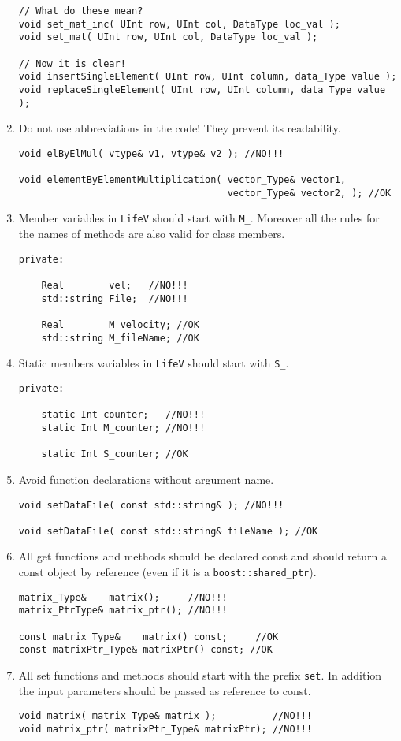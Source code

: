 \documentclass[a4paper]{article}
\begin{document}
\begin{enumerate}
\begin{lstlisting}
// What do these mean?
void set_mat_inc( UInt row, UInt col, DataType loc_val );
void set_mat( UInt row, UInt col, DataType loc_val );

// Now it is clear!
void insertSingleElement( UInt row, UInt column, data_Type value );
void replaceSingleElement( UInt row, UInt column, data_Type value );

  \end{lstlisting}
  \item Do not use abbreviations in the code! They prevent its readability.
\begin{lstlisting}
void elByElMul( vtype& v1, vtype& v2 ); //NO!!!

void elementByElementMultiplication( vector_Type& vector1,
                                     vector_Type& vector2, ); //OK
\end{lstlisting}
  \item Member variables in \texttt{LifeV} should start with \texttt{M\_}. Moreover all the rules for the names of methods are also valid for class members.
\begin{lstlisting}
private:

    Real        vel;   //NO!!!
    std::string File;  //NO!!!

    Real        M_velocity; //OK
    std::string M_fileName; //OK
\end{lstlisting}
  \item Static members variables in \texttt{LifeV} should start with \texttt{S\_}.
\begin{lstlisting}
private:

    static Int counter;   //NO!!!
    static Int M_counter; //NO!!!

    static Int S_counter; //OK
\end{lstlisting}
  \item Avoid function declarations without argument name.
\begin{lstlisting}
void setDataFile( const std::string& ); //NO!!!

void setDataFile( const std::string& fileName ); //OK
\end{lstlisting}
  \item All get functions and methods should be declared const and should return a const object by reference (even if it is a \texttt{boost::shared\_ptr}).
\begin{lstlisting}
matrix_Type&    matrix();     //NO!!!
matrix_PtrType& matrix_ptr(); //NO!!!

const matrix_Type&    matrix() const;     //OK
const matrixPtr_Type& matrixPtr() const; //OK
\end{lstlisting}
  \item All set functions and methods should start with the prefix \texttt{set}. In addition the input parameters should be passed as reference to const.
\begin{lstlisting}
void matrix( matrix_Type& matrix );          //NO!!!
void matrix_ptr( matrixPtr_Type& matrixPtr); //NO!!!


\end{lstlisting}
\end{enumerate}
\end{document}
